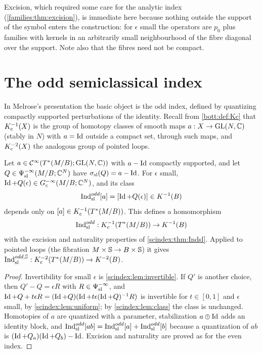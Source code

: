 \begin{remark}\label{scindex:rem:excision-trivial}
  Excision, which required some care for the analytic index (\cref{families:thm:excision}),
  is immediate here because nothing outside the support of the symbol enters the
  construction: for $\epsilon$ small the operators are $p_0$ plus families with
  kernels in an arbitrarily small neighbourhood of the fibre diagonal over the
  support. Note also that the fibres need not be compact.
\end{remark}

\section{The odd semiclassical index}\label{scindex:sec:odd}

In Melrose's presentation the basic object is the odd index, defined by quantizing
compactly supported perturbations of the identity. Recall from \cref{bott:def:Kc}
that $K_{\mathrm{c}}^{-1}(X)$ is the group of homotopy classes of smooth maps
$a:X\to\operatorname{GL}(N,\mathbb{C})$ (stably in $N$) with $a=\operatorname{Id}$ outside a compact set, through
such maps, and $K_{\mathrm{c}}^{-2}(X)$ the analogous group of pointed loops.

\begin{proposition}\label{scindex:prop:odd}
  Let $a\in\mathcal{C}^\infty(T^*(M/B);\operatorname{GL}(N,\mathbb{C}))$ with $a-\operatorname{Id}$ compactly supported, and let
  $Q\in\Psi^{-\infty}_{\mathrm{sl}}(M/B;\mathbb{C}^N)$ have $\sigma_{\mathrm{sl}}(Q)=a-\operatorname{Id}$. For $\epsilon$ small,
  $\operatorname{Id}+Q(\epsilon)\in G^{-\infty}_{\mathrm c}(M/B;\mathbb{C}^N)$, and its class
  \begin{equation*}
    \operatorname{Ind}^{odd}_{\mathrm{sl}}[a]=[\operatorname{Id}+Q(\epsilon)]\in K^{-1}(B)
  \end{equation*}
  depends only on $[a]\in K_{\mathrm{c}}^{-1}(T^*(M/B))$. This defines a homomorphism
  \begin{equation*}
    \operatorname{Ind}^{odd}_{\mathrm{sl}}:K_{\mathrm{c}}^{-1}(T^*(M/B))\to K^{-1}(B)
  \end{equation*}
  with the excision and naturality
  properties of \cref{scindex:thm:Indsl}. Applied to pointed loops (the fibration
  $M\times\mathbb{S}\to B\times\mathbb{S}$) it gives
  $\operatorname{Ind}^{odd,\mathbb{S}}_{\mathrm{sl}}:K_{\mathrm{c}}^{-2}(T^*(M/B))\to K^{-2}(B)$.
\end{proposition}
\begin{proof}
  Invertibility for small $\epsilon$ is \cref{scindex:lem:invertible}. If $Q'$ is
  another choice, then $Q'-Q=\epsilon R$ with $R\in\Psi^{-\infty}_{\mathrm{sl}}$, and
  $\operatorname{Id}+Q+t\epsilon R=(\operatorname{Id}+Q)(\operatorname{Id}+t\epsilon(\operatorname{Id}+Q)^{-1}R)$ is invertible for
  $t\in[0,1]$ and $\epsilon$ small, by \cref{scindex:lem:uniform}; by
  \cref{scindex:lem:class} the class is unchanged. Homotopies of $a$ are
  quantized with a parameter, stabilization $a\oplus\operatorname{Id}$ adds an identity block,
  and $\operatorname{Ind}^{odd}_{\mathrm{sl}}[ab]=\operatorname{Ind}^{odd}_{\mathrm{sl}}[a]+\operatorname{Ind}^{odd}_{\mathrm{sl}}[b]$ because a quantization of $ab$ is
  $(\operatorname{Id}+Q_a)(\operatorname{Id}+Q_b)-\operatorname{Id}$. Excision and naturality are proved as for the even
  index.
\end{proof}

